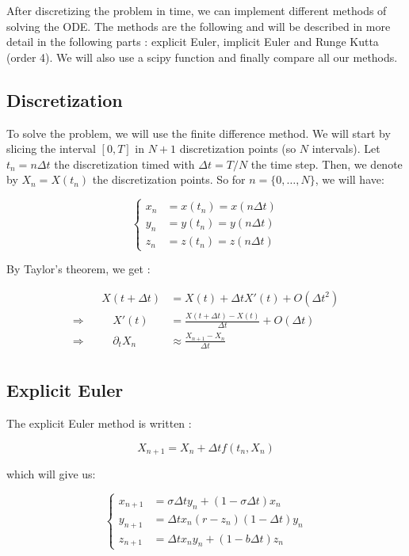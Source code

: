 \documentclass[12pt]{article}
\begin{document}
	\noindent After discretizing the problem in time, we can implement different methods of solving the ODE. The methods are the following and will be described in more detail in the following parts : explicit Euler, implicit Euler and Runge Kutta (order 4). We will also use a scipy function and finally compare all our methods.

	\subsection{Discretization}
	
	To solve the problem, we will use the finite difference method. We will start by slicing the interval $[0,T]$ in $N+1$ discretization points (so $N$ intervals). Let $t_n=n\Delta t$ the discretization timed with $\Delta t=T/N$ the time step. Then, we denote by $X_n=X(t_n)$ the discretization points. So for $n=\{0,\dots,N\}$, we will have:
	
	$$\left\{\begin{aligned} 
		x_n&=x(t_n)=x(n\Delta t) \\
		y_n&=y(t_n)=y(n\Delta t) \\
		z_n&=z(t_n)=z(n\Delta t)
	\end{aligned}\right.$$
	
	\noindent By Taylor's theorem, we get :
	
	$$\begin{aligned}
		&&X(t+\Delta t)&=X(t)+\Delta t X'(t) + O(\Delta t^2) \\
		\Rightarrow&& \quad X'(t)&=\frac{X(t+\Delta t)-X(t)}{\Delta t} + O(\Delta t) \\
		\Rightarrow&& \quad \partial_t X_n&\approx\frac{X_{n+1}-X_n}{\Delta t} \\
	\end{aligned}
	$$	
	
	\subsection{Explicit Euler}
	
	The explicit Euler method is written :
	
	$$X_{n+1}=X_n+\Delta t f(t_n,X_n)$$
	
	\noindent which will give us:
	
	$$\left\{\begin{aligned} 
		x_{n+1}&=\sigma\Delta t y_n+(1-\sigma\Delta t) x_n \\
		y_{n+1}&=\Delta t x_n(r-z_n)(1-\Delta t)y_n \\
		z_{n+1}&=\Delta t x_ny_n+(1-b\Delta t)z_n
	\end{aligned}\right.$$
	
\end{document}
